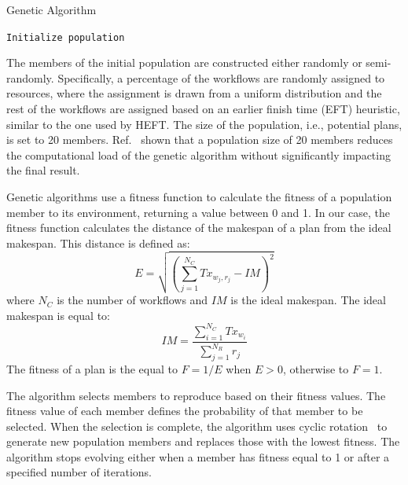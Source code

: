 \begin{algorithm}[t]
    \caption{Genetic Algorithm}
    \label{alg:gen_algo}
    \scriptsize
    \begin{algorithmic}[1]
        \State \texttt{Initialize population}
        \EndWhile
        \EndProcedure
    \end{algorithmic}
\end{algorithm}

The members of the initial population are constructed either randomly or
semi-randomly. Specifically, a percentage of the workflows are randomly assigned
to resources, where the assignment is drawn from a uniform distribution and the
rest of the workflows are assigned based on an earlier finish time (EFT)
heuristic, similar to the one used by HEFT. The size of the population, i.e.,
potential plans, is set to 20 members. Ref.~\cite{zomaya2001observations} shown
that a population size of 20 members reduces the computational load of the
genetic algorithm without significantly impacting the final result.

Genetic algorithms use a fitness function to calculate the fitness of a
population member to its environment, returning a value between 0 and 1. In our
case, the fitness function calculates the distance of the makespan of a plan
from the ideal makespan. This distance is defined as:
\begin{equation}
E = \sqrt{(\sum_{j=1}^{N_{C}}Tx_{w_{j},r_{j}} - IM)^2}
\label{eq:fitness}
\end{equation}
where $N_{C}$ is the number of workflows and $IM$ is the ideal makespan. The
ideal makespan is equal to:
\begin{equation}
IM = \frac{\sum_{i=1}^{N_{C}}Tx_{w_{i}}}{\sum_{j=1}^{N_{R}}r_{j}}
\label{eq:ideal_fitness}
\end{equation}
The fitness of a plan is the equal to $F = 1/E$ when $E > 0$, otherwise to $F =
1$.

The algorithm selects members to reproduce based on their fitness values. The
fitness value of each member defines the probability of that member to be
selected. When the selection is complete, the algorithm uses cyclic
rotation~\cite{oliver1987study} to generate new population members and replaces
those with the lowest fitness.
The algorithm stops evolving either when a member has fitness equal to 1 or
after a specified number of iterations.

